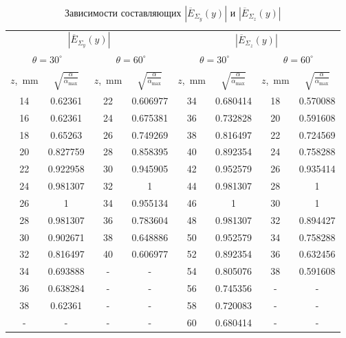 \documentclass[11pt,a4paper,oneside, titlepage,reqno]{amsproc}
\begin{document}
\begin{centering}
\begin{table}[h!]
\vspace{10pt}
\begin{tabular}{cccccccc}
\toprule %
\multicolumn{4}{c}{$|\overline{E}_{\Sigma_y}(y)|$} &
\multicolumn{4}{c}{$|\overline{E}_{\Sigma_z}(y)|$} \\[5 pt]
\multicolumn{2}{c}{$\theta = 30^\circ$} & 
\multicolumn{2}{c}{$\theta = 60^\circ$} &
\multicolumn{2}{c}{$\theta = 30^\circ$} & 
\multicolumn{2}{c}{$\theta = 60^\circ$} \\
$z$,~mm & $\sqrt{\frac{\alpha}{\alpha_{\max}}}$ &
$z$,~mm & $\sqrt{\frac{\alpha}{\alpha_{\max}}}$ &
$z$,~mm & $\sqrt{\frac{\alpha}{\alpha_{\max}}}$ &
$z$,~mm & $\sqrt{\frac{\alpha}{\alpha_{\max}}}$ \\
\midrule
14  &  0.62361   &  22  &  0.606977  &  34  &  0.680414  &  18  &  0.570088  \\
16  &  0.62361   &  24  &  0.675381  &  36  &  0.732828  &  20  &  0.591608  \\
18  &  0.65263   &  26  &  0.749269  &  38  &  0.816497  &  22  &  0.724569  \\
20  &  0.827759  &  28  &  0.858395  &  40  &  0.892354  &  24  &  0.758288  \\
22  &  0.922958  &  30  &  0.945905  &  42  &  0.952579  &  26  &  0.935414  \\
24  &  0.981307  &  32  &  1         &  44  &  0.981307  &  28  &  1         \\
26  &  1         &  34  &  0.955134  &  46  &  1         &  30  &  1         \\
28  &  0.981307  &  36  &  0.783604  &  48  &  0.981307  &  32  &  0.894427  \\
30  &  0.902671  &  38  &  0.648886  &  50  &  0.952579  &  34  &  0.758288  \\
32  &  0.816497  &  40  &  0.606977  &  52  &  0.892354  &  36  &  0.632456  \\
34  &  0.693888  &  -   &  -         &  54  &  0.805076  &  38  &  0.591608  \\
36  &  0.638284  &  -   &  -         &  56  &  0.745356  &  -   &  -         \\
38  &  0.62361   &  -   &  -         &  58  &  0.720083  &  -   &  -         \\
-   &  -         &  -   &  -         &  60  &  0.680414  &  -   &  -         \\
\bottomrule
\end{tabular}
\vspace{5 pt}
\caption{Зависимости составляющих $|\overline{E}_{\Sigma_y}(y)|$ и $|\overline{E}_{\Sigma_z}(y)|$} 
\label{tab:tab2}
\end{table}
\end{centering}
\end{document}
